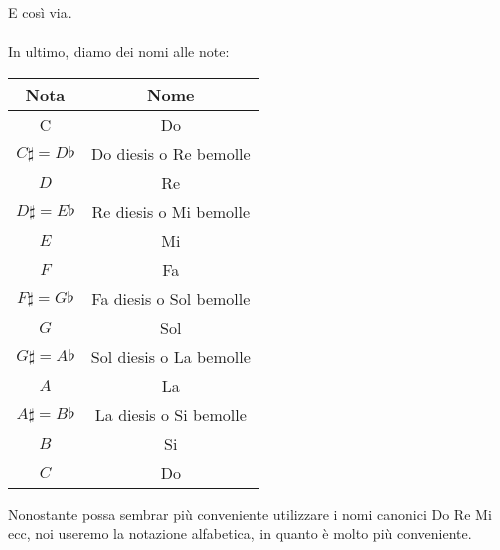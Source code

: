 \documentclass[12pt,a4paper]{report}
\theoremstyle{definition}
\theoremstyle{Theorem}
\theoremstyle{definition}
\theoremstyle{definition}
\theoremstyle{definition}
\begin{document}
	  E così via.\\
	  \\
	  In ultimo, diamo dei nomi alle note: 
	   \begin{center}
	  	\begin{tabular}{||c|c||} 
	  		\hline
	  		Nota & Nome \\ [0.5ex] 
	  		\hline\hline
	  		C & Do\\ 
	  		\hline
	  		$C\sharp=D\flat$ & Do diesis o Re bemolle \\
	  		\hline
	  		$D$ & Re\\
	  		\hline
	  		$D\sharp=E\flat$ & Re diesis o Mi bemolle\\
	  		\hline
	  		$E$ & Mi \\ [1ex] 
	  		\hline
	  		$F$ & Fa \\
	  		\hline
	  		$F\sharp=G\flat$ & Fa diesis o Sol bemolle\\
	  		\hline
	  		$G$ & Sol\\
	  		\hline
	  		$G\sharp=A\flat$ & Sol diesis o La bemolle \\  
	  		\hline
	  		$A$ & La \\
	  		\hline
	  		$A\sharp=B\flat$ & La diesis o Si bemolle\\
	  		\hline
	  		$B$ & Si\\
	  		\hline
	  		$C$ & Do \\  
	  		\hline
	  	\end{tabular}
	  \end{center}
	  Nonostante possa sembrar più conveniente utilizzare i nomi canonici Do Re Mi ecc, noi useremo la notazione alfabetica, in quanto è molto più conveniente.
\end{document}
